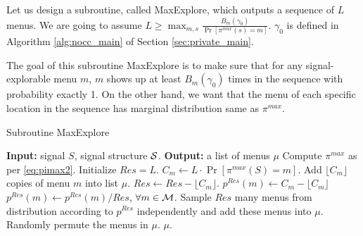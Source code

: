 \begin{comment}
\begin{definition}[Max-support policy]
Given a signal structure $\S$, a recommendation policy $\pi$ is called the $\delta$-max-support policy if $\forall s \in \X$  and $\delta$-signal-explorable menu $m\in \M$ given $s$, $\Pr[\pi(s) = m] > 0$.
\end{definition}

By Claim \ref{clm:nocc_lp_a}, we have the following claim.
\begin{claim}
\label{clm:pimax_nocc}
The following $\pi^{max}$ is a $(\delta+2\beta|\X|)$-BIC and $\delta$-max-support policy. Here $\M'$ is the set of menus with positive solutions in the LP mentioned in Claim \ref{clm:nocc_lp_a}.
\[
\pi^{max} = \frac{1}{|\X|} \sum_{s \in \X} \frac{1}{|\M'|} \sum_{m \in \M'} \pi^{m,s}.
\]
\end{claim}
\end{comment}


Let us design a subroutine, called  MaxExplore, which outputs a sequence of $L$ menus. We are going to assume $L \geq \max_{m,s} \frac{B_m(\gamma_0)}{ \Pr[\pi^{max}(s)=m]}$. $\gamma_0$ is defined in Algorithm \ref{alg:nocc_main} of Section \ref{sec:private_main}.

The goal of this subroutine MaxExplore is to make sure that for any signal-explorable menu $m$, $m$ shows up at least $B_m(\gamma_0)$ times in the sequence with probability exactly 1. On the other hand, we want that the menu of each specific location in the sequence has marginal distribution same as $\pi^{max}$.

 \begin{algorithm}[H]
    \caption{Subroutine MaxExplore}
    	\label{alg:nocc_explore}
    \begin{algorithmic}[1]
	\STATE \textbf{Input:} signal $S$, signal structure $\S$.
	\STATE \textbf{Output:} a list of menus $\mu$
	\STATE Compute $\pi^{max}$ as per \eqref{eq:pimax2}.
		\STATE Initialize $Res = L$.
			\STATE $C_m \leftarrow L \cdot \Pr[\pi^{max}(S) = m]$.
                     		\STATE Add $\lfloor C_m\rfloor$ copies of menu $m$ into list $\mu$.
			\STATE $Res \leftarrow Res -\lfloor C_m \rfloor $.
			\STATE $p^{Res}(m)\leftarrow  C_m -  \lfloor C_m\rfloor$
		\ENDFOR
		\STATE $p^{Res}(m) \leftarrow p^{Res}(m) / Res$, $\forall m \in \M$.
		\STATE Sample $Res$ many menus from distribution according to $p^{Res}$ independently and add these menus into $\mu$.
		\STATE Randomly permute the menus in $\mu$.
	\RETURN $\mu$.	
     \end{algorithmic}
\end{algorithm}

